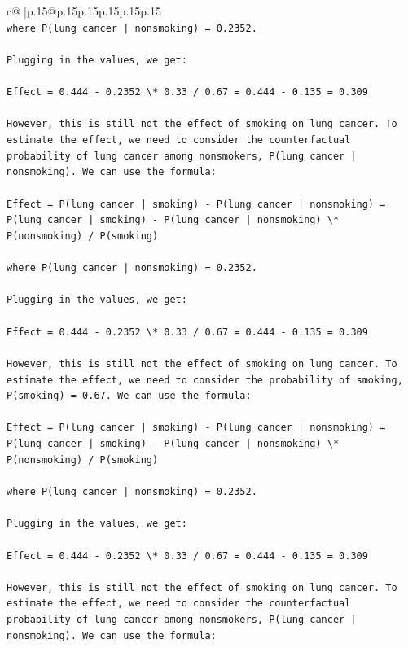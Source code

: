 \documentclass{article}
\begin{document}
{\begin{supertabular}{c@{$\;$}|p{.15\linewidth}@{}p{.15\linewidth}p{.15\linewidth}p{.15\linewidth}p{.15\linewidth}p{.15\linewidth}}
{{{\\ 
\texttt{where P(lung cancer | nonsmoking) = 0.2352.} \\
\\ 
\texttt{Plugging in the values, we get:} \\
\\ 
\texttt{Effect = 0.444 {-} 0.2352 \textbackslash{}* 0.33 / 0.67 = 0.444 {-} 0.135 = 0.309} \\
\\ 
\texttt{However, this is still not the effect of smoking on lung cancer. To estimate the effect, we need to consider the counterfactual probability of lung cancer among nonsmokers, P(lung cancer | nonsmoking). We can use the formula:} \\
\\ 
\texttt{Effect = P(lung cancer | smoking) {-} P(lung cancer | nonsmoking) = P(lung cancer | smoking) {-} P(lung cancer | nonsmoking) \textbackslash{}* P(nonsmoking) / P(smoking)} \\
\\ 
\texttt{where P(lung cancer | nonsmoking) = 0.2352.} \\
\\ 
\texttt{Plugging in the values, we get:} \\
\\ 
\texttt{Effect = 0.444 {-} 0.2352 \textbackslash{}* 0.33 / 0.67 = 0.444 {-} 0.135 = 0.309} \\
\\ 
\texttt{However, this is still not the effect of smoking on lung cancer. To estimate the effect, we need to consider the probability of smoking, P(smoking) = 0.67. We can use the formula:} \\
\\ 
\texttt{Effect = P(lung cancer | smoking) {-} P(lung cancer | nonsmoking) = P(lung cancer | smoking) {-} P(lung cancer | nonsmoking) \textbackslash{}* P(nonsmoking) / P(smoking)} \\
\\ 
\texttt{where P(lung cancer | nonsmoking) = 0.2352.} \\
\\ 
\texttt{Plugging in the values, we get:} \\
\\ 
\texttt{Effect = 0.444 {-} 0.2352 \textbackslash{}* 0.33 / 0.67 = 0.444 {-} 0.135 = 0.309} \\
\\ 
\texttt{However, this is still not the effect of smoking on lung cancer. To estimate the effect, we need to consider the counterfactual probability of lung cancer among nonsmokers, P(lung cancer | nonsmoking). We can use the formula:} \\
}}}
\end{supertabular}}
\end{document}
